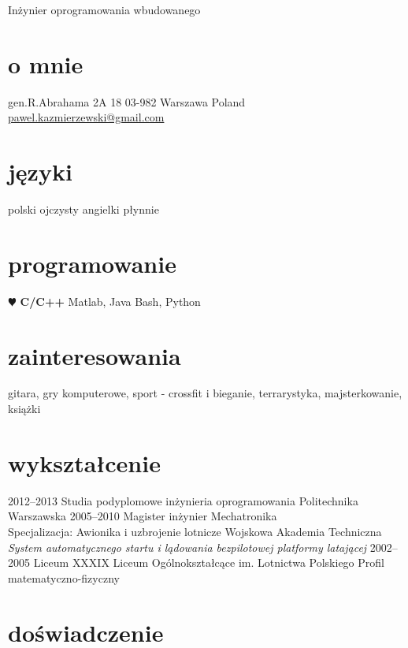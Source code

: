 \documentclass[]{friggeri-cv}
\begin{document}
       {Inżynier oprogramowania wbudowanego}


\begin{aside}
  \section{o mnie}
    gen.R.Abrahama 2A 18
    03-982 Warszawa
    Poland
    ~
    \href{mailto:pawel.kazmierzewski@gmail.com}{pawel.kazmierzewski@gmail.com}
  \section{języki}
    polski  ojczysty
    angielki płynnie
  \section{programowanie}
  {\color{red} $\varheartsuit$} {\bf C/C++}
    Matlab, Java
    Bash, Python
\end{aside}

\section{zainteresowania}

gitara, gry komputerowe, sport - crossfit i bieganie, terrarystyka, majsterkowanie, książki 

\section{wykształcenie}

\begin{entrylist}
  \entry
  {2012–2013}
  {Studia podyplomowe {\normalfont inżynieria oprogramowania}}
  {Politechnika Warszawska}
  {}
  \entry
  {2005–2010}
  {Magister inżynier
    {\normalfont Mechatronika\\
    Specjalizacja: Awionika i uzbrojenie lotnicze}}
  {Wojskowa Akademia Techniczna}
  {\emph{System automatycznego startu i lądowania bezpilotowej platformy latającej}}
  \entry
    {2002–2005}
    {Liceum}
    {XXXIX Liceum Ogólnokształcące im. Lotnictwa Polskiego}
    {Profil matematyczno-fizyczny}
\end{entrylist}

\section{doświadczenie}
\end{document}
